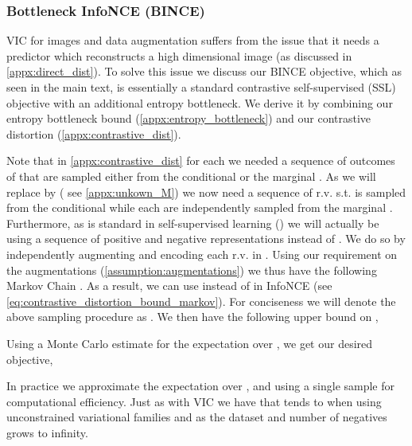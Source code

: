 \documentclass[final]{article}
\begin{document}
\subsubsection{Bottleneck InfoNCE (BINCE)}

VIC for images and data augmentation suffers from the issue that it needs a predictor which reconstructs a high dimensional image (as discussed in \cref{appx:direct_dist}).
To solve this issue we discuss our BINCE objective, which as seen in the main text, is essentially a standard contrastive self-supervised (SSL) objective with an additional entropy bottleneck.
We derive it by combining our entropy bottleneck bound (\cref{appx:entropy_bottleneck}) and our contrastive distortion (\cref{appx:contrastive_dist}).

Note that in \cref{appx:contrastive_dist} for each  we needed a sequence  of outcomes of  that are sampled either from the conditional  or the marginal  .
As we will replace  by  ( see \cref{appx:unkown_M}) we now need a sequence of r.v.   s.t.  is  sampled from the conditional  while each  are independently sampled from the marginal .
Furthermore, as is standard in self-supervised learning (\eg \cite{chen_simple_2020,oord_representation_2019}) we will actually be using a sequence  of positive and negative representations instead of .
We do so by independently augmenting and encoding each r.v. in .
Using our requirement on the augmentations (\cref{assumption:augmentations}) we thus have the following Markov Chain .
As a result, we can use  instead of  in InfoNCE (see \cref{eq:contrastive_distortion_bound_markov}).
For conciseness we will denote the above sampling procedure as .
We then have the following upper bound on ,

Using a Monte Carlo estimate for the expectation over , we get our desired objective,

In practice we approximate the expectation over , and  using a single sample for computational efficiency.
Just as with VIC we have that  tends to  when using unconstrained variational families and as the dataset and number of negatives  grows to infinity.
\end{document}
